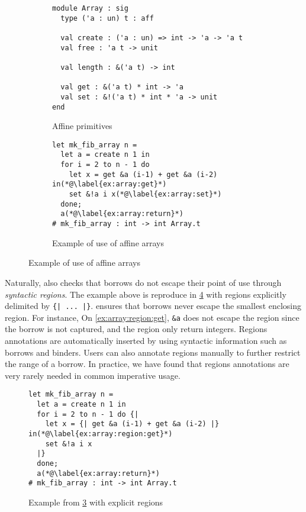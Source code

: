\begin{figure}
  \centering
  \begin{subfigure}{0.48\linewidth}
\begin{lstlisting}
module Array : sig
  type ('a : un) t : aff
  
  val create : ('a : un) => int -> 'a -> 'a t
  val free : 'a t -> unit

  val length : &('a t) -> int

  val get : &('a t) * int -> 'a
  val set : &!('a t) * int * 'a -> unit
end
\end{lstlisting}
    \caption{Affine primitives}
    \label{sig:array}
  \end{subfigure}\hfill
  \begin{subfigure}{0.5\linewidth}
\begin{lstlisting}
let mk_fib_array n =
  let a = create n 1 in
  for i = 2 to n - 1 do
    let x = get &a (i-1) + get &a (i-2) in(*@\label{ex:array:get}*)
    set &!a i x(*@\label{ex:array:set}*)
  done;
  a(*@\label{ex:array:return}*)
# mk_fib_array : int -> int Array.t
\end{lstlisting}
    \caption{Example of use of affine arrays}
    \label{ex:array}
  \end{subfigure}
\end{figure}

Naturally, \lang also checks that borrows do not escape their point
of use through {\em syntactic regions}. The example
above is reproduce in \cref{ex:array:region} with
regions explicitly delimited by \lstinline/{| ... |}/.
\lang ensures that borrows never escape the smallest enclosing
region.
For instance, On \cref{ex:array:region:get}, \lstinline/&a/ does
not escape the region since the borrow is not captured, and the
region only return integers.
Regions annotations are automatically inserted by \lang using
syntactic information such as borrows and binders.
Users can also annotate regions manually to further restrict the range
of a borrow. In practice, we have found that regions
annotations are very rarely needed in common imperative usage.


\begin{figure}
  \centering
\begin{lstlisting}
let mk_fib_array n =
  let a = create n 1 in
  for i = 2 to n - 1 do {|
    let x = {| get &a (i-1) + get &a (i-2) |} in(*@\label{ex:array:region:get}*)
    set &!a i x
  |}
  done;
  a(*@\label{ex:array:return}*)
# mk_fib_array : int -> int Array.t
\end{lstlisting}
    \caption{Example from \cref{ex:array} with explicit regions}
    \label{ex:array:region}
\end{figure}




